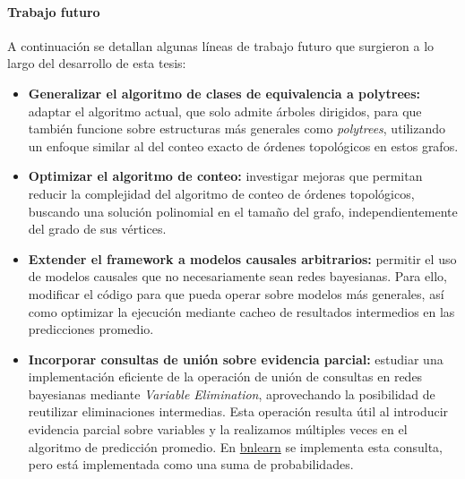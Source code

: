 \paragraph{Trabajo futuro}

A continuación se detallan algunas líneas de trabajo futuro que surgieron a lo largo del desarrollo de esta tesis:

\begin{itemize}
  \item \textbf{Generalizar el algoritmo de clases de equivalencia a polytrees:} adaptar el algoritmo actual, que solo admite árboles dirigidos, para que también funcione sobre estructuras más generales como \emph{polytrees}, utilizando un enfoque similar al del conteo exacto de órdenes topológicos en estos grafos.

  \item \textbf{Optimizar el algoritmo de conteo:} investigar mejoras que permitan reducir la complejidad del algoritmo de conteo de órdenes topológicos, buscando una solución polinomial en el tamaño del grafo, independientemente del grado de sus vértices.

  \item \textbf{Extender el framework a modelos causales arbitrarios:} permitir el uso de modelos causales que no necesariamente sean redes bayesianas. Para ello, modificar el código para que pueda operar sobre modelos más generales, así como optimizar la ejecución mediante cacheo de resultados intermedios en las predicciones promedio.


  \item \textbf{Incorporar consultas de unión sobre evidencia parcial:} estudiar una implementación eficiente de la operación de unión de consultas en redes bayesianas mediante \emph{Variable Elimination}, aprovechando la posibilidad de reutilizar eliminaciones intermedias. Esta operación resulta útil al introducir evidencia parcial sobre variables y la realizamos múltiples veces en el algoritmo de predicción promedio.
  En \href{https://rdrr.io/github/vspinu/bnlearn/man/cpquery.html#:~:text=When%20,be%20treated%20as%20a%20list}{bnlearn} se implementa esta consulta, pero está implementada como una suma de probabilidades. 


\end{itemize}
